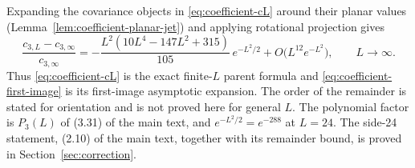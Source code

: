 \begin{remark}\label{rem:coefficient-first-image}
Expanding the covariance objects in \eqref{eq:coefficient-cL} around their planar values (Lemma~\ref{lem:coefficient-planar-jet}) and applying rotational projection gives
\begin{equation}\label{eq:coefficient-first-image}
\frac{c_{3,L}-c_{3,\infty}}{c_{3,\infty}}=-\frac{L^2(10L^4-147L^2+315)}{105}\,e^{-L^2/2}+O\bigl(L^{12}e^{-L^2}\bigr),\qquad L\to\infty .
\end{equation}
Thus \eqref{eq:coefficient-cL} is the exact finite-$L$ parent formula and \eqref{eq:coefficient-first-image} is its first-image asymptotic expansion. The order of the remainder is stated for orientation and is not proved here for general $L$. The polynomial factor is $P_3(L)$ of (3.31) of the main text, and $e^{-L^2/2}=e^{-288}$ at $L=24$. The side-24 statement, (2.10) of the main text, together with its remainder bound, is proved in Section~\ref{sec:correction}.
\end{remark}
